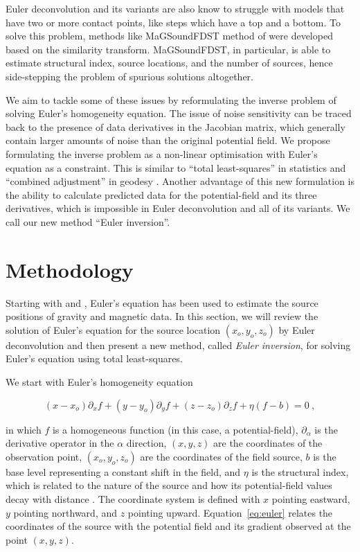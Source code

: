 Euler deconvolution and its variants are also know to struggle with models that
have two or more contact points, like steps which have a top and a bottom.
To solve this problem, methods like MaGSoundFDST method of
\citet{Gerovska2010} were developed based on the similarity transform.
MaGSoundFDST, in particular, is able to estimate structural index, source
locations, and the number of sources, hence side-stepping the problem of
spurious solutions altogether.


We aim to tackle some of these issues by reformulating the inverse problem of
solving Euler's homogeneity equation.
The issue of noise sensitivity can be traced back to the presence of data
derivatives in the Jacobian matrix, which generally contain larger amounts of
noise than the original potential field.
We propose formulating the inverse problem as a non-linear optimisation with
Euler's equation as a constraint.
This is similar to ``total least-squares'' in statistics \citep{VanHuffel1991}
and ``combined adjustment'' in geodesy \citep{Vanicek1986}.
Another advantage of this new formulation is the ability to calculate predicted
data for the potential-field and its three derivatives, which is impossible in
Euler deconvolution and all of its variants.
We call our new method ``Euler inversion''.

\section{Methodology}

Starting with \citet{Thompson1982} and \citet{Reid1990}, Euler's equation has
been used to estimate the source positions of gravity and magnetic data.
In this section, we will review the solution of Euler's equation for the source
location $(x_o, y_o, z_o)$ by Euler deconvolution \citep{Reid1990} and then
present a new method, called \textit{Euler inversion}, for solving Euler's
equation using total least-squares.

We start with Euler's homogeneity equation

\begin{equation}
  (x - x_o)\partial_x f + (y - y_o)\partial_y f + (z - z_o)\partial_z f
  + \eta(f - b) = 0
  \ ,
  \label{eq:euler}
\end{equation}

\noindent
in which $f$ is a homogeneous function (in this case, a potential-field),
$\partial_\alpha$ is the derivative operator in the $\alpha$ direction,
$(x, y, z)$ are the coordinates of the observation point,
$(x_o, y_o, z_o)$ are the coordinates of the field source,
$b$ is the base level representing a constant shift in the field,
and $\eta$ is the structural index, which is related to the nature of the
source and how its potential-field values decay with distance
\citep{Ruddock1966,Reid2014}.
The coordinate system is defined with $x$ pointing eastward, $y$ pointing northward, and $z$ pointing upward.
Equation~\ref{eq:euler} relates the coordinates of the source with the
potential field and its gradient observed at the point $(x, y, z)$.

